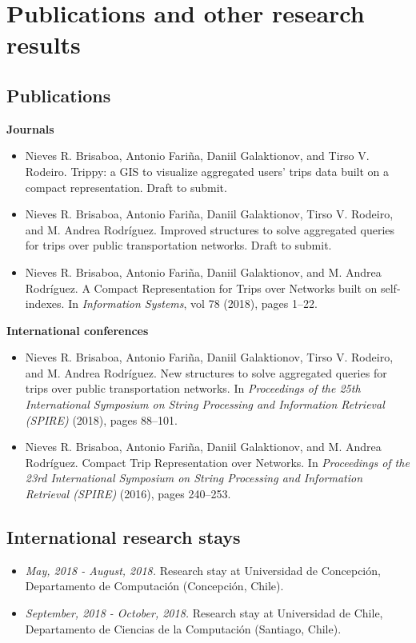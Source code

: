 \chapter{Publications and other research results}
\label{ch:appendix-publications}


\section*{Publications}

{\noindent \bfseries Journals}
\begin{itemize}
    \item Nieves R. Brisaboa, Antonio Fari\~na, Daniil Galaktionov, and Tirso V. Rodeiro.
	Trippy: a GIS to visualize aggregated users' trips data built on a compact representation.
	Draft to submit.

    \item Nieves R. Brisaboa, Antonio Fari\~na, Daniil Galaktionov, Tirso V. Rodeiro, and M. Andrea Rodr\'iguez.
	Improved structures to solve aggregated queries for trips over public transportation networks.
	Draft to submit.

	\item Nieves R. Brisaboa, Antonio Fari\~na, Daniil Galaktionov, and M. Andrea Rodr\'iguez.
	A Compact Representation for Trips over Networks built on self-indexes.
	In \textit{Information Systems}, vol 78 (2018), pages 1--22.
\end{itemize}


{\noindent \bfseries International conferences}

\begin{itemize}
	\item Nieves R. Brisaboa, Antonio Fari\~na, Daniil Galaktionov, Tirso V. Rodeiro, and M. Andrea Rodr\'iguez.
	New structures to solve aggregated queries for trips over public transportation networks.
	In \textit{Proceedings of the 25th International Symposium on String Processing and Information Retrieval (SPIRE)} (2018), pages 88--101.
	
	\item Nieves R. Brisaboa, Antonio Fari\~na, Daniil Galaktionov, and M. Andrea Rodr\'iguez.
	Compact Trip Representation over Networks.
	In \textit{Proceedings of the 23rd International Symposium on String Processing and Information Retrieval (SPIRE)} (2016), pages 240--253.
\end{itemize}

\section*{International research stays}

\begin{itemize}

    \item {\itshape May, 2018 - August, 2018.} Research stay at Universidad de Concepci\'on,
Departamento de Computaci\'on (Concepci\'on, Chile).

	\item {\itshape September, 2018 - October, 2018.} Research stay at Universidad de Chile,
Departamento de Ciencias de la Computaci\'on (Santiago, Chile).

\end{itemize}
